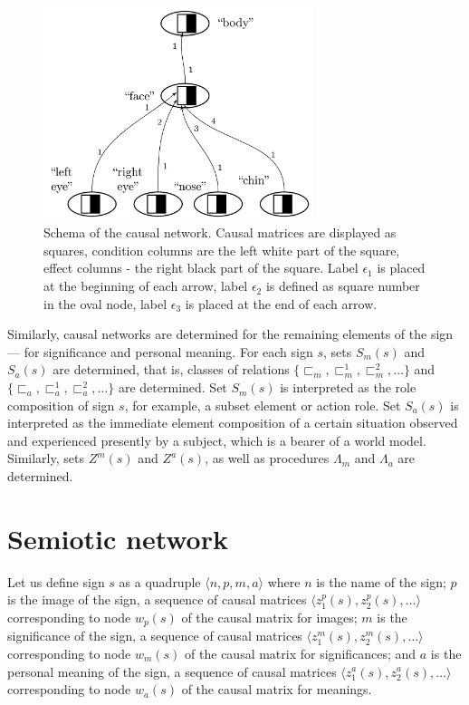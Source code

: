 \documentclass[review]{elsarticle}
\begin{document}
\begin{figure}
	\centering
	\includegraphics[width=0.7\textwidth]{caus_net_en}
	\caption{Schema of the causal network. Causal matrices are displayed as squares, condition columns are the left white part of the square,  effect columns - the right black part of the square. Label $\epsilon_1$ is placed at the beginning of each arrow, label $\epsilon_2$ is defined as square number in the oval node, label $\epsilon_3$  is placed at the end of each arrow.}
	\label{fig:caus_net}		
\end{figure}

Similarly, causal networks are determined for the remaining elements of the sign --- for significance and personal meaning. For each sign $s$, sets $S_m(s)$ and $S_a(s)$ are determined, that is, classes of relations $\{\sqsubset_m,\sqsubset_m^1,\sqsubset_m^2,\dots\}$ and $\{\sqsubset_a,\sqsubset_a^1,\sqsubset_a^2,\dots\}$ are determined. Set $S_m(s)$ is interpreted as the role composition of sign $s$, for example, a subset element or action role. Set $S_a(s)$ is interpreted as the immediate element composition of a certain situation observed and experienced presently by a subject, which is a bearer of a world model. Similarly, sets $Z^m(s)$ and $Z^a(s)$, as well as procedures $\Lambda_m$ and $\Lambda_a$ are determined.


\section{Semiotic network}\label{sec:semiotics}

Let us define sign $s$ as a quadruple $\langle n, p, m, a\rangle$ where $n$ is the name of the sign; $p$ is the image of the sign, a sequence of causal matrices $\langle z_1^p(s), z_2^p(s), \dots\rangle$ corresponding to node $w_p(s)$ of the causal matrix for images; $m$ is the significance of the sign, a sequence of causal matrices $\langle z_1^m(s), z_2^m(s), \dots\rangle$ corresponding to node $w_m(s)$ of the causal matrix for significances; and $a$ is the personal meaning of the sign, a sequence of causal matrices $\langle z_1^a(s), z_2^a(s), \dots\rangle$ corresponding to node $w_a(s)$ of the causal matrix for meanings.
\end{document}

